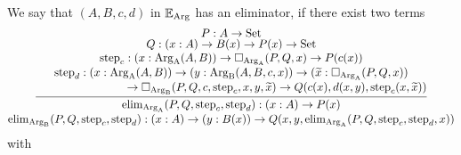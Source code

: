 \documentclass[orivec,envcountsame, ,envcountsect]{llncs}
\begin{document}
\begin{definition}
  We say that $(A, B, c, d)$ in $\mathbb{E}_{\text{Arg}}$ has an
  eliminator, if there exist two terms 
\[
\deduce{\elim_{\ArgBpp}(P, Q, \stepind{c}, \stepind{d}) : (x : A) \to (y : B(x)) \to Q(x, y, \elim_{\ArgA}(P, Q, \stepind{c}, \stepind{d}, x))}
       {\infer{\elim_{\ArgA}(P, Q, \stepind{c}, \stepind{d}) : (x : A) \to P(x)}
       {\deduce{
          \deduce{
            \deduce{\qquad\qquad\qquad\qquad \to  \BOX_{\ArgBpp}(P, Q, c, \stepind{c}, x, y, \stepindarg{x}) \to 
      Q(c(x), d(x, y), \stepind{c}(x, \stepindarg{x}))}{\stepind{d} : (x : \ArgA(A, B)) \to (y : \ArgBpp(A, B, c, x)) \to
   (\stepindarg{x} : \BOX_{\ArgA}(P, Q, x))}}
                 {\stepind{c} : (x : \ArgA(A, B)) \to \BOX_{\ArgA}(P, Q, x) \to P(c(x))}}
          {\deduce{Q : (x : A) \to B(x) \to P(x) \to \Set}{P : A \to \Set}}}}
\]
with 
\begin{align*}

\end{align*}
\end{definition}
\end{document}

